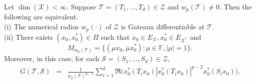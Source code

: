 \documentclass[10pt,a4paper]{amsart}
\begin{document}
\begin{theorem}\label{th-04}
		Let $\dim(\mathcal{X})<\infty.$  Suppose $\mathcal{T}=(T_1,\ldots,T_d)\in \mathcal{Z}$ and $w_p(\mathcal{T})\neq 0.$ Then the following are equivalent.\\
		\rm(i) The numerical radius $w_p(\cdot)$ of $\mathcal{Z}$ is Gateaux differentiable at $\mathcal{T}.$\\
		\rm(ii) There exists $(x_0,x_0^*)\in \Pi$ such that $x_0\in E_{\mathcal{X}}, x_0^*\in E_{\mathcal{X}^*}$ and $$M_{w_p(\mathcal{T})}=\{(\mu x_0, \overline{\mu} x_0^*):\mu\in \mathbb{F},|\mu|=1\}.$$
		Moreover, in this case, for each $\mathcal{S}=(S_1,\ldots,S_d) \in \mathcal{Z},$
	\begin{eqnarray*}
		G(\mathcal{T},\mathcal{S})
		&=&\frac{1}{w_p(\mathcal{T})^{p-1}}\sum_{i=1}^d\Re\bigg(\overline{x_0^*(T_ix_0)}|x_0^*(T_ix_0)|^{p-2}x_0^*(S_ix_0) \bigg).
	\end{eqnarray*}
\end{theorem}
\end{document}
